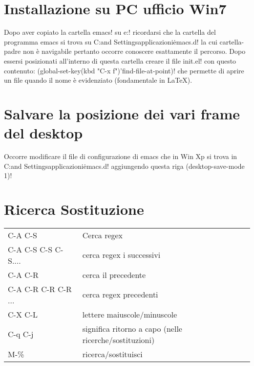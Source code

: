 \documentclass{article}
\begin{document}
\section{Installazione su PC ufficio Win7}
Dopo aver copiato la cartella emacs! su e:\programmi! ricordarsi che la cartella del programma emacs si trova su C:\Documents and Settings\valcavi\Dati applicazioni\.emacs.d! la cui cartella-padre non è navigabile pertanto occorre conoscere esattamente il percorso. Dopo essersi posizionati all'interno di questa cartella creare il file init.el! con questo contenuto: (global-set-key(kbd "C-x f")'find-file-at-point)! che permette di aprire un file quando il nome è evidenziato (fondamentale in \LaTeX).

\section{Salvare la posizione dei vari frame del desktop}
Occorre modificare il file di configurazione di emacs che in Win Xp si trova in  C:\Documents and Settings\valcavi\Dati applicazioni\.emacs.d! aggiungendo questa riga (desktop-save-mode 1)!

\section{Ricerca Sostituzione}

\begin{tabular}{ll}
  C-A C-S & Cerca regex\\
  C-A C-S C-S C-S.... & cerca regex i successivi \\
  C-A C-R & cerca il precedente \\
  C-A C-R C-R C-R ... & cerca regex precedenti \\
  C-X C-L & lettere maiuscole/minuscole \\
  C-q C-j & significa ritorno a capo (nelle ricerche/sostituzioni) \\
  M-\% & ricerca/sostituisci\\
\end{tabular}
\end{document}
